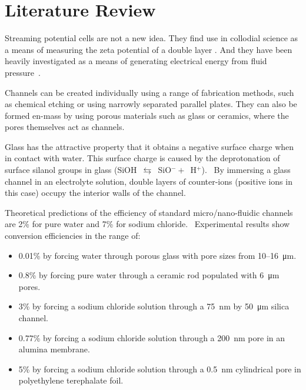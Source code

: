   \section{Literature Review}

    Streaming potential cells are not a new idea.
    They find use in collodial science as a means of measuring the zeta potential of a double layer \cite{Gu2000,Scales1992,Daiguji2004,VanderHeyden2006,Mala1997}.
    And they have been heavily investigated as a means of generating electrical energy from fluid pressure~\cite{Chang2009,Daiguji2006,Daiguji2004b,Davidson2008a,Davidson2008,CherngHon2012,Jiao2014,Lu2006,Olthuis2005,Osterle1964,Pennathur2007,Ren2008a,VanderHeyden2006,Heyden2007,Xie2008,Yang2003}.

    Channels can be created individually using a range of fabrication methods, such as chemical etching or using narrowly separated parallel plates.
    They can also be formed en-mass by using porous materials such as glass or ceramics, where the pores themselves act as channels.

    Glass has the attractive property that it obtains a negative surface charge when in contact with water.
    This surface charge is caused by the deprotonation of surface silanol groups in glass (SiOH~$\leftrightarrows$~SiO$^{-}+$~H$^{+}$).~\cite{Kirby2004a}
    By immersing a glass channel in an electrolyte solution, double layers of counter-ions (positive ions in this case) occupy the interior walls of the channel.

    Theoretical predictions of the efficiency of standard micro/nano-fluidic channels are 2\% for pure water and 7\% for sodium chloride.~\cite{VanderHeyden2006}
    Experimental results show conversion efficiencies in the range of:
    \begin{itemize}
        \item 0.01\% by forcing water through porous glass with pore sizes from 10\thinspace--\SI{16}{\micro\metre}.~\cite{Yang2003}
        \item 0.8\% by forcing pure water through a ceramic rod populated with \SI{6}{\micro\metre} pores.~\cite{Yang2004}
        \item 3\% by forcing a sodium chloride solution through a \SI{75}{\nano\metre} by \SI{50}{\micro\metre} silica channel.~\cite{Heyden2007}
        \item 0.77\% by forcing a sodium chloride solution through a \SI{200}{\nano\metre} pore in an alumina membrane.~\cite{Lu2006}
        \item 5\% by forcing a sodium chloride solution through a \SI{0.5}{\nano\metre} cylindrical pore in polyethylene terephalate foil.~\cite{Xie2008}
    \end{itemize}

